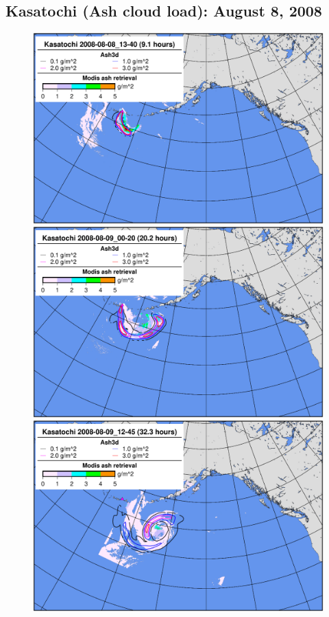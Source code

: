 \subsection{Kasatochi (Ash cloud load): August 8, 2008}
\begin{figure}[htbp]
\includegraphics[angle=0,scale=0.3]{Figures/TestCase_Results/ValidTest/Kasatochi_CloudLoad_0.pdf}
\includegraphics[angle=0,scale=0.3]{Figures/TestCase_Results/ValidTest/Kasatochi_CloudLoad_1.pdf}
\includegraphics[angle=0,scale=0.3]{Figures/TestCase_Results/ValidTest/Kasatochi_CloudLoad_2.pdf}

\end{figure}
